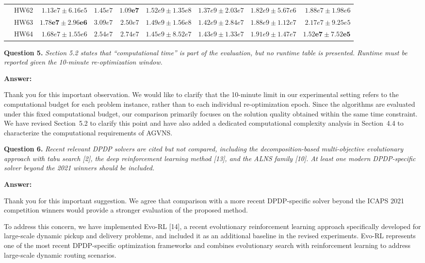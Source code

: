 \documentclass[11pt]{article}
\newcommand{\question}[2]{\vspace{0.5em}\noindent\textbf{Question #1.} \emph{#2}\par}
\newcommand{\answer}{\noindent\textbf{Answer:}\par}
\begin{document}
{\begin{table}
\begin{tabular}{l|r|r|r|r|r|r|r|r}
& HW62 & $1.13e7 \pm 6.16e5$ & $1.45e7$ & $\mathbf{1.09e7}$
& $1.52e9 \pm 1.35e8$
& $1.37e9 \pm 2.03e7$
& $1.82e9 \pm 5.67e6$
& $1.88e7 \pm 1.98e6$ \\

& HW63 & $\mathbf{1.78e7 \pm 2.96e6}$ & $3.09e7$ & $2.50e7$
& $1.49e9 \pm 1.56e8$
& $1.42e9 \pm 2.84e7$
& $1.88e9 \pm 1.12e7$
& $2.17e7 \pm 9.25e5$ \\

& HW64 & $1.68e7 \pm 1.55e6$ & $2.54e7$ & $2.74e7$
& $1.45e9 \pm 8.52e7$
& $1.43e9 \pm 1.33e7$
& $1.91e9 \pm 1.47e7$
& $\mathbf{1.52e7 \pm 7.52e5}$ \\
\hline

\end{tabular}
\end{table}
}
\question{5}{Section 5.2 states that ``computational time'' is part of the evaluation, but no runtime table is presented. Runtime must be reported given the 10-minute re-optimization window.}
\answer
Thank you for this important observation. We would like to clarify that the 10-minute limit in our experimental setting refers to the computational budget for each problem instance, rather than to each individual re-optimization epoch. Since the algorithms are evaluated under this fixed computational budget, our comparison primarily focuses on the solution quality obtained within the same time constraint. We have revised Section~5.2 to clarify this point and have also added a dedicated computational complexity analysis in Section~4.4 to characterize the computational requirements of AGVNS.

\question{6}{Recent relevant DPDP solvers are cited but not compared, including the decomposition-based multi-objective evolutionary approach with tabu search [2], the deep reinforcement learning method [13], and the ALNS family [10]. At least one modern DPDP-specific solver beyond the 2021 winners should be included.}

\answer
Thank you for this important suggestion. We agree that comparison with a more recent DPDP-specific solver beyond the ICAPS 2021 competition winners would provide a stronger evaluation of the proposed method.

To address this concern, we have implemented Evo-RL [14], a recent evolutionary reinforcement learning approach specifically developed for large-scale dynamic pickup and delivery problems, and included it as an additional baseline in the revised experiments. Evo-RL represents one of the most recent DPDP-specific optimization frameworks and combines evolutionary search with reinforcement learning to address large-scale dynamic routing scenarios.
\end{document}
